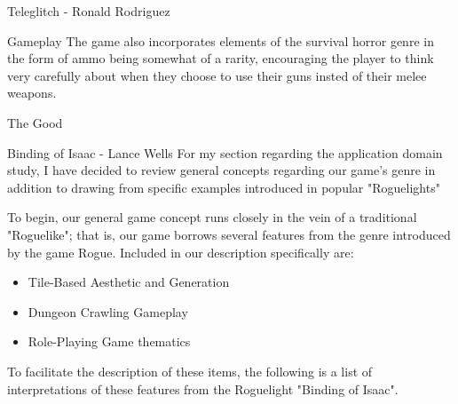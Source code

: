 \documentclass[12pt]{report}
\begin{document}
\begin{section}{Teleglitch - Ronald Rodriguez}
\begin{subsection}{Gameplay}
The game also incorporates elements of the survival horror genre in the form of 
ammo being somewhat of a rarity, encouraging the player to think very carefully 
about when they choose to use their guns insted of their melee weapons.
\end{subsection}

\begin{subsection}{The Good}

\end{subsection}

\end{section}

\begin{section}{Binding of Isaac - Lance Wells}
For my section regarding the application domain study, I have decided to review
general concepts regarding our game's genre in addition to drawing from specific
examples introduced in popular "Roguelights"

To begin, our general game concept runs closely in the vein of a traditional 
"Roguelike"; that is, our game borrows several features from the genre introduced 
by the game Rogue. Included in our description specifically are:
\begin{itemize}
	\item Tile-Based Aesthetic and Generation
	\item Dungeon Crawling Gameplay
	\item Role-Playing Game thematics
\end{itemize}


To facilitate the description of these items, the following is a list of 
interpretations of these features from the Roguelight "Binding of Isaac".


\end{section}
\end{document}
